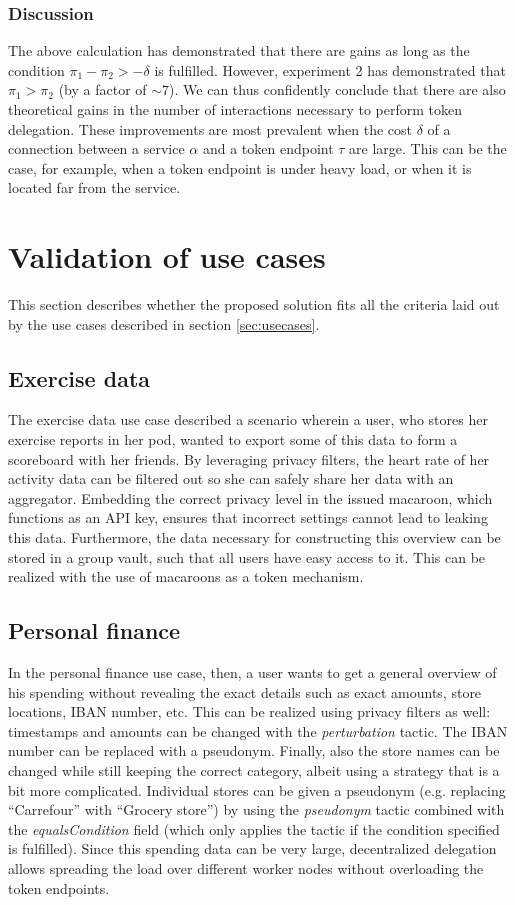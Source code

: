 \subsubsection{Discussion}
The above calculation has demonstrated that there are gains as long as the condition $\pi_1 - \pi_2 > -\delta$ is fulfilled. However, experiment 2 has demonstrated that $\pi_1 > \pi_2$ (by a factor of $\sim 7$). We can thus confidently conclude that there are also theoretical gains in the number of interactions necessary to perform token delegation. These improvements are most prevalent when the cost $\delta$ of a connection between a service $\alpha$ and a token endpoint $\tau$ are large. This can be the case, for example, when a token endpoint is under heavy load, or when it is located far from the service.


\section{Validation of use cases}
This section describes whether the proposed solution fits all the criteria laid out by the use cases described in section \ref{sec:usecases}.

\subsection{Exercise data}
The exercise data use case described a scenario wherein a user, who stores her exercise reports in her pod, wanted to export some of this data to form a scoreboard with her friends. By leveraging privacy filters, the heart rate of her activity data can be filtered out so she can safely share her data with an aggregator. Embedding the correct privacy level in the issued macaroon, which functions as an API key, ensures that incorrect settings cannot lead to leaking this data. Furthermore, the data necessary for constructing this overview can be stored in a group vault, such that all users have easy access to it. This can be realized with the use of macaroons as a token mechanism. 

\subsection{Personal finance}
In the personal finance use case, then, a user wants to get a general overview of his spending without revealing the exact details such as exact amounts, store locations, IBAN number, etc. This can be realized using privacy filters as well: timestamps and amounts can be changed with the \textit{perturbation} tactic. The IBAN number can be replaced with a pseudonym. Finally, also the store names can be changed while still keeping the correct category, albeit using a strategy that is a bit more complicated. Individual stores can be given a pseudonym (e.g. replacing ``Carrefour'' with ``Grocery store'') by using the \textit{pseudonym} tactic combined with the \textit{equalsCondition} field (which only applies the tactic if the condition specified is fulfilled). Since this spending data can be very large, decentralized delegation allows spreading the load over different worker nodes without overloading the token endpoints.

